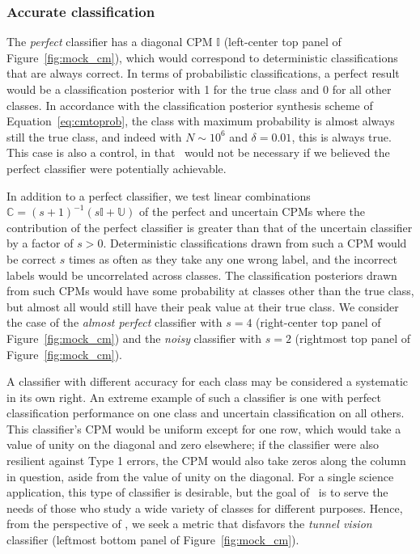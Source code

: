 \subsubsection{Accurate classification}
\label{sec:accuratedata}

The \textit{perfect} classifier has a diagonal CPM $\mathbb{I}$ (left-center top panel of Figure~\ref{fig:mock_cm}), which would correspond to deterministic classifications that are always correct.
In terms of probabilistic classifications, a perfect result would be a classification posterior with 1 for the true class and 0 for all other classes.
In accordance with the classification posterior synthesis scheme of Equation~\ref{eq:cmtoprob}, the class with maximum probability is almost always still the true class, and indeed with $N \sim 10^{6}$ and $\delta = 0.01$, this is always true.
This case is also a control, in that \plasticc\ would not be necessary if we believed the perfect classifier were potentially achievable.

In addition to a perfect classifier, we test linear combinations $\mathbb{C} = (s + 1)^{-1} \left(s\mathbb{I} + \mathbb{U}\right)$ of the perfect and uncertain CPMs where the contribution of the perfect classifier is greater than that of the uncertain classifier by a factor of $s > 0$.
Deterministic classifications drawn from such a CPM would be correct $s$ times as often as they take any one wrong label, and the incorrect labels would be uncorrelated across classes.
The classification posteriors drawn from such CPMs would have some probability at classes other than the true class, but almost all would still have their peak value at their true class.
We consider the case of the \textit{almost perfect} classifier with $s=4$ (right-center top panel of Figure~\ref{fig:mock_cm}) and the \textit{noisy} classifier with $s=2$ (rightmost top panel of Figure~\ref{fig:mock_cm}).

A classifier with different accuracy for each class may be considered a systematic in its own right.
An extreme example of such a classifier is one with perfect classification performance on one class and uncertain classification on all others.
This classifier's CPM would be uniform except for one row, which would take a value of unity on the diagonal and zero elsewhere; if the classifier were also resilient against Type 1 errors, the CPM would also take zeros along the column in question, aside from the value of unity on the diagonal.
For a single science application, this type of classifier is desirable, but the goal of \plasticc\ is to serve the needs of those who study a wide variety of classes for different purposes.
Hence, from the perspective of \plasticc, we seek a metric that disfavors the \textit{tunnel vision} classifier (leftmost bottom panel of Figure~\ref{fig:mock_cm}).

